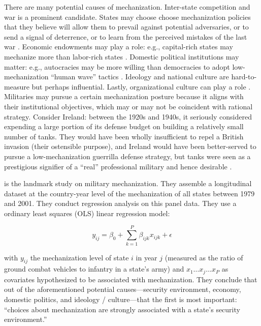 \documentclass{article}
\begin{document}
There are many potential causes of mechanization. Inter-state
competition and war is a prominent candidate. States may choose choose mechanization policies 
that they believe will allow them to prevail against potential adversaries, or to send a
signal of deterrence, or to learn from the perceived mistakes of the last war
\citep{mearsheimer1983conventional,huth1988extended,murray2011military}. 
Economic endowments may play a role: e.g., capital-rich states may mechanize more
than labor-rich states \citep{gartzke2001democracy}. Domestic political
institutions may matter: e.g., autocracies may be more willing than democracies to adopt
low-mechanization ``human wave'' tactics
\citep{quinlivan1999coup,reiter2002democracies,brooks2008shaping,talmadge2015dictator}. 
Ideology \citep{van1984cult} and national culture \citep[e.g.][]{pollack2004arabs} are
hard-to-measure but perhaps influential. Lastly,
organizational culture can play a role \citep{builder1989masks}. Militaries may pursue a
certain mechanization posture because it aligns with their institutional
objectives, which may or may not be coincident with rational strategy. 
Consider Ireland: between the 1920s and 1940s, it seriously considered expending a 
large portion of its defense budget on building a relatively small number of tanks. 
They would have been wholly insufficient to repel a British invasion (their ostensible purpose), 
and Ireland would have been better-served to pursue a low-mechanization guerrilla defense strategy, 
but tanks were seen as a prestigious signifier of a ``real'' professional
military and hence desirable
\citep{farrell1998professionalization,farrell2001transnational}. 

\citet{sechser2010army} is the landmark study on military mechanization. They
assemble a longitudinal dataset at the country-year level of the mechanization
of all states between 1979 and 2001. They conduct regression analysis on this
panel data. They use a ordinary least squares (OLS) linear regression model:

\begin{equation}
y_{ij} = \beta_0 + \sum_{k=1}^P \beta_{ijk}x_{ijk} + \epsilon
\end{equation}

with $y_{ij}$ the mechanization level of state $i$ in year $j$ (measured as the 
ratio of ground combat vehicles to infantry in a state's army) and $x_1 \ldots
x_j \ldots x_{P}$ as covariates hypothesized to be associated with
mechanization. They conclude that out of the
aforementioned potential causes---security environment, economy, domestic
politics, and ideology / culture---that the first is most important: ``choices about
mechanization are strongly associated with a state's security environment.''
\end{document}
